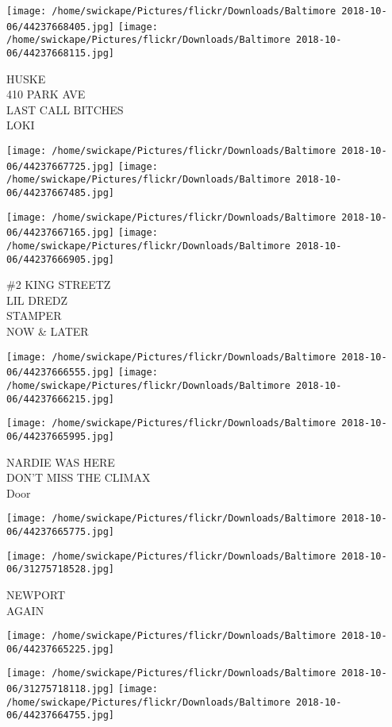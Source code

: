 \documentclass[10pt,letterpaper]{article}
\begin{document}
\texttt{[image: /home/swickape/Pictures/flickr/Downloads/Baltimore 2018-10-06/44237668405.jpg]}
\texttt{[image: /home/swickape/Pictures/flickr/Downloads/Baltimore 2018-10-06/44237668115.jpg]}

HUSKE\\
410 PARK AVE\\
LAST CALL BITCHES\\
LOKI
\pagebreak

\texttt{[image: /home/swickape/Pictures/flickr/Downloads/Baltimore 2018-10-06/44237667725.jpg]}
\texttt{[image: /home/swickape/Pictures/flickr/Downloads/Baltimore 2018-10-06/44237667485.jpg]}

\texttt{[image: /home/swickape/Pictures/flickr/Downloads/Baltimore 2018-10-06/44237667165.jpg]}
\texttt{[image: /home/swickape/Pictures/flickr/Downloads/Baltimore 2018-10-06/44237666905.jpg]}

\#2 KING STREETZ\\
LIL DREDZ\\
STAMPER\\
NOW \& LATER
\pagebreak

\texttt{[image: /home/swickape/Pictures/flickr/Downloads/Baltimore 2018-10-06/44237666555.jpg]}
\texttt{[image: /home/swickape/Pictures/flickr/Downloads/Baltimore 2018-10-06/44237666215.jpg]}

\texttt{[image: /home/swickape/Pictures/flickr/Downloads/Baltimore 2018-10-06/44237665995.jpg]}

NARDIE WAS HERE\\
DON'T MISS THE CLIMAX\\
Door
\pagebreak

\texttt{[image: /home/swickape/Pictures/flickr/Downloads/Baltimore 2018-10-06/44237665775.jpg]}

\vspace{0.25in}
\texttt{[image: /home/swickape/Pictures/flickr/Downloads/Baltimore 2018-10-06/31275718528.jpg]}

NEWPORT\\
AGAIN
\pagebreak

\texttt{[image: /home/swickape/Pictures/flickr/Downloads/Baltimore 2018-10-06/44237665225.jpg]}

\vspace{0.25in}
\texttt{[image: /home/swickape/Pictures/flickr/Downloads/Baltimore 2018-10-06/31275718118.jpg]}
\texttt{[image: /home/swickape/Pictures/flickr/Downloads/Baltimore 2018-10-06/44237664755.jpg]}
\end{document}
